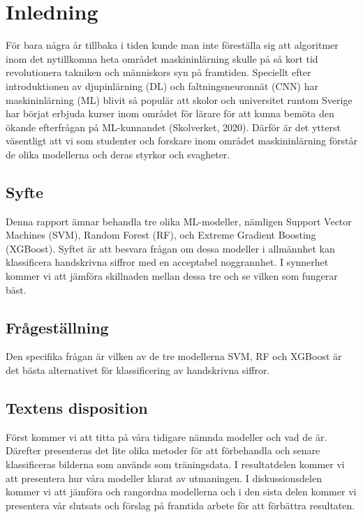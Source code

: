 \documentclass[12pt,a4paper]{article}
\begin{document}
\newpage

\section{Inledning}

För bara några år tillbaka i tiden kunde man inte föreställa sig att algoritmer inom det nytillkomna heta området maskininlärning skulle på så kort tid revolutionera takniken och människors syn på framtiden. Speciellt efter introduktionen av djupinlärning (DL) och faltningsneuronnät (CNN) har maskininlärning (ML) blivit så populär att skolor och universitet runtom Sverige har börjat erbjuda kurser inom området för lärare för att kunna bemöta den ökande efterfrågan på ML-kunnandet (Skolverket, 2020). Därför är det ytterst väsentligt att vi som studenter och forskare inom området maskininlärning förstår de olika modellerna och deras styrkor och svagheter.

\subsection{Syfte}

Denna rapport ämnar behandla tre olika ML-modeller, nämligen Support Vector Machines (SVM), Random Forest (RF), och Extreme Gradient Boosting (XGBoost). Syftet är att besvara frågan om dessa modeller i allmännhet kan klassificera handskrivna siffror med en acceptabel noggrannhet. I synnerhet kommer vi att jämföra skillnaden mellan dessa tre och se vilken som fungerar bäst. 

\subsection{Frågeställning}

Den specifika frågan är vilken av de tre modellerna SVM, RF och XGBoost är det bästa alternativet för klassificering av handskrivna siffror.

\subsection{Textens disposition}

Först kommer vi att titta på våra tidigare nämnda modeller och vad de är. Därefter presenteras det lite olika metoder för att förbehandla och senare klassificeras bilderna som används som träningsdata. I resultatdelen kommer vi att presentera hur våra modeller klarat av utmaningen. I diskussionsdelen kommer vi att jämföra och rangordna modellerna och i den sista delen kommer vi presentera vår slutsats och förslag på framtida arbete för att förbättra resultaten.
\end{document}
